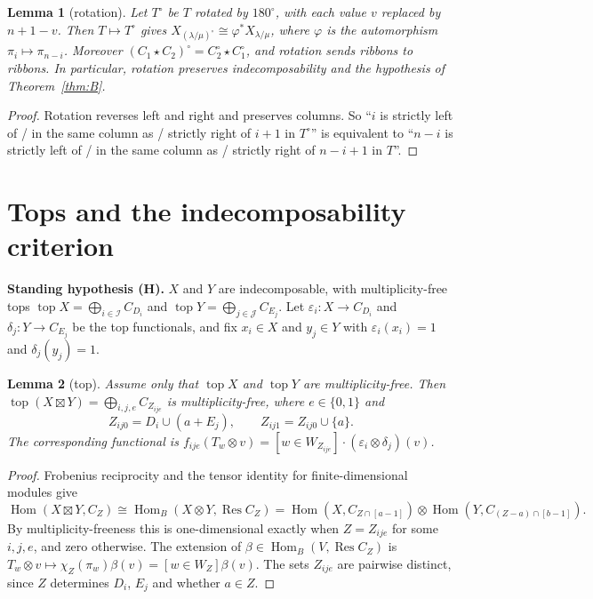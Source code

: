 \documentclass[11pt]{amsart}
\newcommand{\Hom}{\operatorname{Hom}}
\newcommand{\Res}{\operatorname{Res}}
\newcommand{\topp}{\operatorname{top}}
\newcommand{\sq}{\boxtimes}
\newcommand{\Ib}{\mathcal I}
\newcommand{\Jb}{\mathcal J}
\theoremstyle{plain}
\newtheorem{lemmaII}{Lemma}
\theoremstyle{definition}
\begin{document}
\begin{lemmaII}[rotation]\label{II:rot}
Let $T^\circ$ be $T$ rotated by $180^\circ$, with each value $v$ replaced by $n+1-v$. Then $T\mapsto T^\circ$ gives $X_{(\lambda/\mu)^\circ}\cong\varphi^*X_{\lambda/\mu}$, where $\varphi$ is the automorphism $\pi_i\mapsto\pi_{n-i}$. Moreover $(C_1\star C_2)^\circ=C_2^\circ\star C_1^\circ$, and rotation sends ribbons to ribbons. In particular, rotation preserves indecomposability and the hypothesis of Theorem~\ref{thm:B}.
\end{lemmaII}

\begin{proof}
Rotation reverses left and right and preserves columns. So ``$i$ is strictly left of / in the same column as / strictly right of $i+1$ in $T^\circ$'' is equivalent to ``$n-i$ is strictly left of / in the same column as / strictly right of $n-i+1$ in $T$''.
\end{proof}

\section{Tops and the indecomposability criterion}

\noindent\textbf{Standing hypothesis (H).} $X$ and $Y$ are indecomposable, with multiplicity-free tops $\topp X=\bigoplus_{i\in\Ib}C_{D_i}$ and $\topp Y=\bigoplus_{j\in\Jb}C_{E_j}$. Let $\varepsilon_i:X\to C_{D_i}$ and $\delta_j:Y\to C_{E_j}$ be the top functionals, and fix $x_i\in X$ and $y_j\in Y$ with $\varepsilon_i(x_i)=1$ and $\delta_j(y_j)=1$.

\begin{lemmaII}[top]\label{II:top}
Assume only that $\topp X$ and $\topp Y$ are multiplicity-free. Then $\topp(X\sq Y)=\bigoplus_{i,j,e}C_{Z_{ije}}$ is multiplicity-free, where $e\in\{0,1\}$ and
\[
Z_{ij0}=D_i\cup(a+E_j),\qquad Z_{ij1}=Z_{ij0}\cup\{a\}.
\]
The corresponding functional is $f_{ije}(T_w\otimes v)=[w\in W_{Z_{ije}}]\cdot(\varepsilon_i\otimes\delta_j)(v)$.
\end{lemmaII}

\begin{proof}
Frobenius reciprocity and the tensor identity for finite-dimensional modules give
\[
\Hom(X\sq Y,C_Z)\cong\Hom_B(X\otimes Y,\Res C_Z)=\Hom(X,C_{Z\cap[a-1]})\otimes\Hom(Y,C_{(Z-a)\cap[b-1]}).
\]
By multiplicity-freeness this is one-dimensional exactly when $Z=Z_{ije}$ for some $i,j,e$, and zero otherwise. The extension of $\beta\in\Hom_B(V,\Res C_Z)$ is $T_w\otimes v\mapsto\chi_Z(\pi_w)\beta(v)=[w\in W_Z]\beta(v)$. The sets $Z_{ije}$ are pairwise distinct, since $Z$ determines $D_i$, $E_j$ and whether $a\in Z$.
\end{proof}
\end{document}
